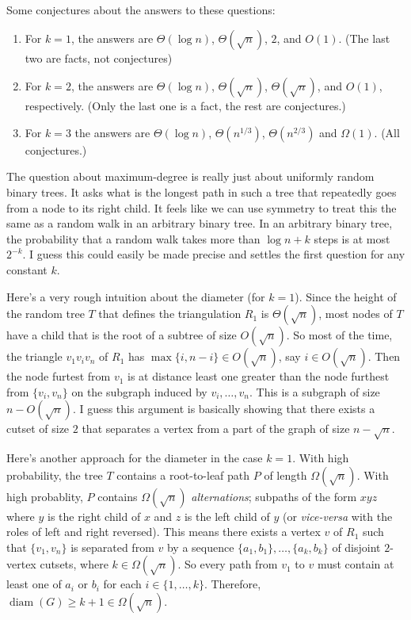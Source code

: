 \documentclass{patmorin}
\DeclareMathOperator{\diam}{diam}
\begin{document}
Some conjectures about the answers to these questions:

\begin{enumerate}
    \item For $k=1$, the answers are $\Theta(\log n)$, $\Theta(\sqrt{n})$, $2$, and $O(1)$.  (The last two are facts, not conjectures)

    \item For $k=2$, the answers are $\Theta(\log n)$, $\Theta(\sqrt{n})$, $\Theta(\sqrt{n})$, and $O(1)$, respectively.  (Only the last one is a fact, the rest are conjectures.)

    \item For $k=3$ the answers are $\Theta(\log n)$, $\Theta(n^{1/3})$, $\Theta(n^{2/3})$ and $\Omega(1)$. (All conjectures.)
\end{enumerate}

The question about maximum-degree is really just about uniformly random binary trees.  It asks what is the longest path in such a tree that repeatedly goes from a node to its right child.  It feels like we can use symmetry to treat this the same as a random walk in an arbitrary binary tree.  In an arbitrary binary tree, the probability that a random walk takes more than $\log n+k$ steps is at most $2^{-k}$.  I guess this could easily be made precise and settles the first question for any constant $k$.

Here's a very rough intuition about the diameter (for $k=1$).  Since the height of the random tree $T$ that defines the triangulation $R_1$ is $\Theta(\sqrt{n})$, most nodes of $T$ have a child that is the root of a subtree of size $O(\sqrt{n})$.  So most of the time, the triangle $v_1v_iv_n$ of $R_1$ has $\max\{i, n-i\}\in O(\sqrt{n})$, say $i\in O(\sqrt{n})$.  Then the node furtest from $v_1$ is at distance least one greater than the node furthest from $\{v_i,v_n\}$ on the subgraph induced by $v_i,\ldots,v_n$.  This is a subgraph of size $n-O(\sqrt{n})$.  I guess this argument is basically showing that there exists a cutset of size $2$ that separates a vertex from a part of the graph of size $n-\sqrt{n}$.

Here's another approach for the diameter in the case $k=1$.  With high probability, the tree $T$ contains a root-to-leaf path $P$ of length $\Omega(\sqrt{n})$.  With high probablity, $P$ contains $\Omega(\sqrt{n})$ \emph{alternations}; subpaths of the form $xyz$ where $y$ is the right child of $x$ and $z$ is the left child of $y$ (or \emph{vice-versa} with the roles of left and right reversed).  This means there exists a vertex $v$ of $R_1$ such that $\{v_1,v_n\}$ is separated from $v$ by a sequence $\{a_1,b_1\},\ldots,\{a_k,b_k\}$ of disjoint $2$-vertex cutsets, where $k\in\Omega(\sqrt{n})$.  So every path from $v_1$ to $v$ must contain at least one of $a_i$ or $b_i$ for each $i\in\{1,\ldots,k\}$.  Therefore, $\diam(G)\ge k+1\in \Omega(\sqrt{n})$.
\end{document}
